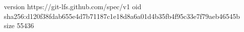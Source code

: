 version https://git-lfs.github.com/spec/v1
oid sha256:d120f38fdab655e4d7b71187c1e18d8a6a01d4b35fb4f95c33e7f79aeb46545b
size 55436
